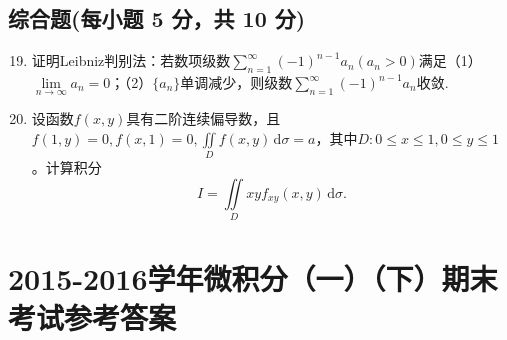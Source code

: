 \documentclass[../main.tex]{subfiles}
\begin{document}
\section{综合题(每小题 5 分，共 10 分)}
\begin{enumerate}
  \setcounter{enumi}{18}
  \item 证明Leibniz判别法：若数项级数$\displaystyle\sum_{n=1}^{\infty}(-1)^{n-1}a_{n}(a_{n}>0)$满足（1）$\lim\limits_{n\to\infty}a_{n}=0$；（2）$\{a_{n}\}$单调减少，则级数$\displaystyle\sum_{n=1}^{\infty}(-1)^{n-1}a_{n}$收敛.
        \vspace{13em}

  \item 设函数$f(x,y)$具有二阶连续偏导数，且$f(1,y)=0,f(x,1)=0,\iint\limits_{D}f(x,y)\,\mathrm{d}\sigma=a$，其中$D:0\leq x\leq1,0\leq y\leq1$。计算积分
        \[
          I=\iint\limits_{D}xyf_{xy}(x,y)\,\mathrm{d}\sigma.
        \]
        \vspace{13em}
\end{enumerate}

\chapter{2015-2016学年微积分（一）（下）期末考试参考答案}
\end{document}
